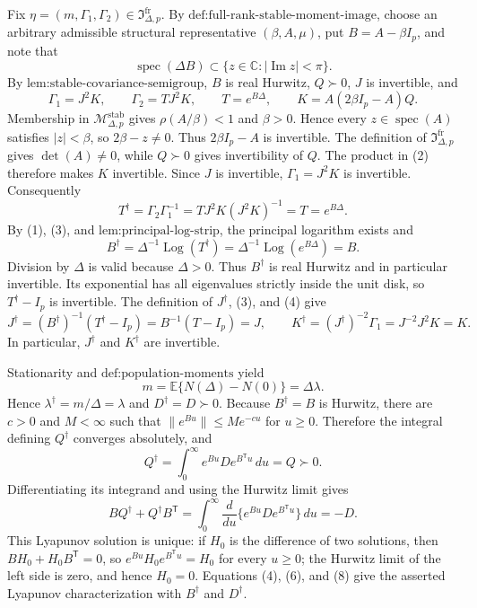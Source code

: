 Fix \(\eta=(m,\Gamma_1,\Gamma_2)\in\mathfrak I_{\Delta,p}^{\mathrm{fr}}\).  By \(\text{def:full-rank-stable-moment-image}\), choose an arbitrary admissible structural representative \((\beta,A,\mu)\), put \(B=A-\beta I_p\), and note that
\[
 \operatorname{spec}(\Delta B)\subset
 \{z\in\mathbb C:|\operatorname{Im}z|<\pi\}.
\tag{1}
\]
By \(\text{lem:stable-covariance-semigroup}\), \(B\) is real Hurwitz, \(Q\succ0\), \(J\) is invertible, and
\[
 \Gamma_1=J^2K,\qquad \Gamma_2=TJ^2K,\qquad
 T=e^{B\Delta},\qquad K=A(2\beta I_p-A)Q.
\tag{2}
\]
Membership in \(\mathcal M_{\Delta,p}^{\mathrm{stab}}\) gives \(\rho(A/\beta)<1\) and \(\beta>0\).  Hence every \(z\in\operatorname{spec}(A)\) satisfies \(|z|<\beta\), so \(2\beta-z\neq0\).  Thus \(2\beta I_p-A\) is invertible.  The definition of \(\mathfrak I_{\Delta,p}^{\mathrm{fr}}\) gives \(\det(A)\neq0\), while \(Q\succ0\) gives invertibility of \(Q\).  The product in (2) therefore makes \(K\) invertible.  Since \(J\) is invertible, \(\Gamma_1=J^2K\) is invertible.  Consequently
\[
 T^\dagger=\Gamma_2\Gamma_1^{-1}
 =TJ^2K(J^2K)^{-1}=T=e^{B\Delta}.
\tag{3}
\]
By (1), (3), and \(\text{lem:principal-log-strip}\), the principal logarithm exists and
\[
 B^\dagger=\Delta^{-1}\operatorname{Log}(T^\dagger)
 =\Delta^{-1}\operatorname{Log}(e^{B\Delta})=B.
\tag{4}
\]
Division by \(\Delta\) is valid because \(\Delta>0\).  Thus \(B^\dagger\) is real Hurwitz and in particular invertible.  Its exponential has all eigenvalues strictly inside the unit disk, so \(T^\dagger-I_p\) is invertible.  The definition of \(J^\dagger\), (3), and (4) give
\[
 J^\dagger=(B^\dagger)^{-1}(T^\dagger-I_p)
 =B^{-1}(T-I_p)=J,
 \qquad
 K^\dagger=(J^\dagger)^{-2}\Gamma_1=J^{-2}J^2K=K.
\tag{5}
\]
In particular, \(J^\dagger\) and \(K^\dagger\) are invertible.

Stationarity and \(\text{def:population-moments}\) yield
\[
 m=\mathbb E\{N(\Delta)-N(0)\}=\Delta\lambda.
\tag{6}
\]
Hence \(\lambda^\dagger=m/\Delta=\lambda\) and \(D^\dagger=D\succ0\).  Because \(B^\dagger=B\) is Hurwitz, there are \(c>0\) and \(M<\infty\) such that \(\|e^{Bu}\|\leq Me^{-cu}\) for \(u\geq0\).  Therefore the integral defining \(Q^\dagger\) converges absolutely, and
\[
 Q^\dagger=\int_0^\infty e^{Bu}De^{B^{\mathsf T}u}\,du=Q\succ0.
\tag{7}
\]
Differentiating its integrand and using the Hurwitz limit gives
\[
 BQ^\dagger+Q^\dagger B^{\mathsf T}
 =\int_0^\infty\frac{d}{du}
   \{e^{Bu}De^{B^{\mathsf T}u}\}\,du=-D.
\tag{8}
\]
This Lyapunov solution is unique: if \(H_0\) is the difference of two solutions, then \(BH_0+H_0B^{\mathsf T}=0\), so \(e^{Bu}H_0e^{B^{\mathsf T}u}=H_0\) for every \(u\geq0\); the Hurwitz limit of the left side is zero, and hence \(H_0=0\).  Equations (4), (6), and (8) give the asserted Lyapunov characterization with \(B^\dagger\) and \(D^\dagger\).

